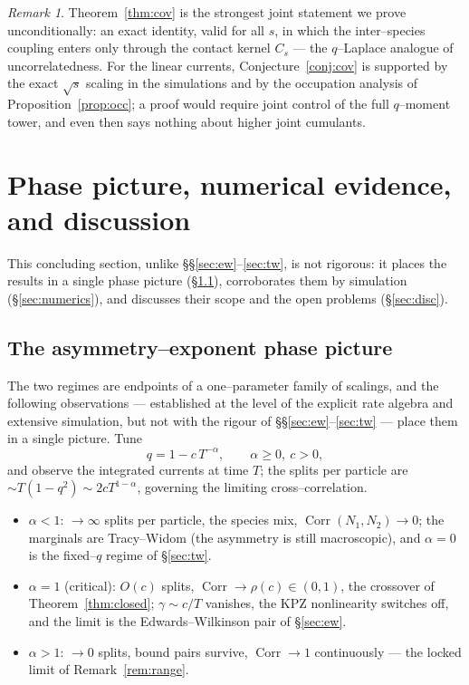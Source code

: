 \documentclass[11pt]{article}
\theoremstyle{plain}
\theoremstyle{definition}
\theoremstyle{remark}
\newtheorem{remark}[theorem]{Remark}
\DeclareMathOperator{\Corr}{Corr}\DeclareMathOperator{\cum}{cum}
\begin{document}
\begin{remark}\label{rem:uncorr}
Theorem~\ref{thm:cov} is the strongest joint statement we prove unconditionally: an
exact identity, valid for all $s$, in which the inter--species coupling enters only
through the contact kernel $C_s$ --- the $q$--Laplace analogue of uncorrelatedness.
For the linear currents, Conjecture~\ref{conj:cov} is supported by the exact
$\sqrt s$ scaling in the simulations and by the occupation analysis of
Proposition~\ref{prop:occ}; a proof would require joint control of the full
$q$--moment tower, and even then says nothing about higher joint cumulants.
\end{remark}

\section{Phase picture, numerical evidence, and discussion}\label{sec:summary}

This concluding section, unlike \S\S\ref{sec:ew}--\ref{sec:tw}, is not rigorous: it
places the results in a single phase picture (\S\ref{sec:phase}), corroborates them by
simulation (\S\ref{sec:numerics}), and discusses their scope and the open problems
(\S\ref{sec:disc}).

\subsection{The asymmetry--exponent phase picture}\label{sec:phase}

The two regimes are endpoints of a one--parameter family of scalings, and the
following observations --- established at the level of the explicit rate algebra and
extensive simulation, but not with the rigour of \S\S\ref{sec:ew}--\ref{sec:tw} --- place
them in a single picture. Tune
\begin{equation}\label{eq:alpha}
  q=1-c\,T^{-\alpha},\qquad \alpha\ge0,\ c>0,
\end{equation}
and observe the integrated currents at time $T$; the splits per particle are
$\sim T(1-q^2)\sim2cT^{1-\alpha}$, governing the limiting cross--correlation.

\begin{itemize}
\item $\alpha<1$: $\to\infty$ splits per particle, the species mix,
$\Corr(N_1,N_2)\to0$; the marginals are Tracy--Widom (the asymmetry is still
macroscopic), and $\alpha=0$ is the fixed--$q$ regime of \S\ref{sec:tw}.
\item $\alpha=1$ (critical): $O(c)$ splits, $\Corr\to\rho(c)\in(0,1)$, the crossover of
Theorem~\ref{thm:closed}; $\gamma\sim c/T$ vanishes, the KPZ nonlinearity switches off,
and the limit is the Edwards--Wilkinson pair of \S\ref{sec:ew}.
\item $\alpha>1$: $\to0$ splits, bound pairs survive, $\Corr\to1$ continuously --- the
locked limit of Remark~\ref{rem:range}.
\end{itemize}
\end{document}
